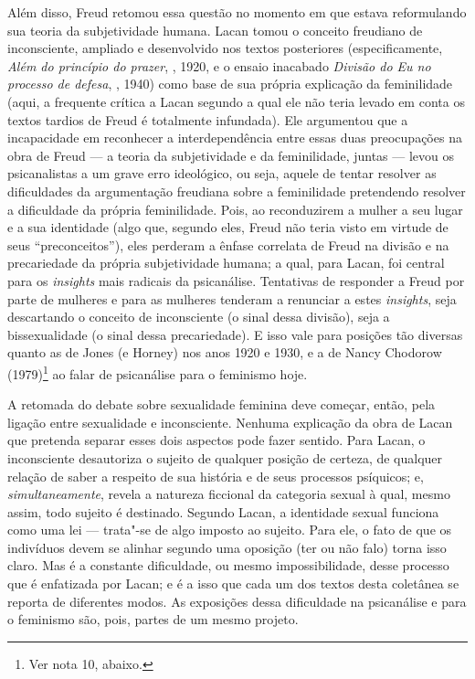 Além disso, Freud retomou essa questão no momento em que estava
reformulando sua teoria da subjetividade humana. Lacan tomou o conceito
freudiano de inconsciente, ampliado e desenvolvido nos textos
posteriores (especificamente, \emph{Além do princípio do prazer}, ,
1920, e o ensaio inacabado \emph{Divisão do Eu no processo de defesa},
, 1940) como base de sua própria explicação da feminilidade (aqui,
a frequente crítica a Lacan segundo a qual ele não teria levado em conta
os textos tardios de Freud é totalmente infundada). Ele argumentou que a
incapacidade em reconhecer a interdependência entre essas duas
preocupações na obra de Freud --- a teoria da subjetividade e da
feminilidade, juntas --- levou os psicanalistas a um grave erro
ideológico, ou seja, aquele de tentar resolver as dificuldades da
argumentação freudiana sobre a feminilidade pretendendo resolver a
dificuldade da própria feminilidade. Pois, ao reconduzirem a mulher a
seu lugar e a sua identidade (algo que, segundo eles, Freud não teria
visto em virtude de seus ``preconceitos''), eles perderam a ênfase
correlata de Freud na divisão e na precariedade da própria subjetividade
humana; a qual, para Lacan, foi central para os \emph{insights} mais
radicais da psicanálise. Tentativas de responder a Freud por parte de
mulheres e para as mulheres tenderam a renunciar a estes
\emph{insights}, seja descartando o conceito de inconsciente (o sinal
dessa divisão), seja a bissexualidade (o sinal dessa precariedade). E
isso vale para posições tão diversas quanto as de Jones (e Horney) nos
anos 1920 e 1930, e a de Nancy Chodorow (1979)\footnote{Ver nota 10,
  abaixo.} ao falar de psicanálise para o feminismo hoje.

A retomada do debate sobre sexualidade feminina deve começar, então,
pela ligação entre sexualidade e inconsciente. Nenhuma explicação da
obra de Lacan que pretenda separar esses dois aspectos pode fazer
sentido. Para Lacan, o inconsciente desautoriza o sujeito de qualquer
posição de certeza, de qualquer relação de saber a respeito de sua
história e de seus processos psíquicos; e, \emph{simultaneamente},
revela a natureza ficcional da categoria sexual à qual, mesmo assim,
todo sujeito é destinado. Segundo Lacan, a identidade sexual funciona
como uma lei --- trata"-se de algo imposto ao sujeito. Para ele, o fato de
que os indivíduos devem se alinhar segundo uma oposição (ter ou não
falo) torna isso claro. Mas é a constante dificuldade, ou mesmo
impossibilidade, desse processo que é enfatizada por Lacan; e é a isso
que cada um dos textos desta coletânea se reporta de diferentes modos.
As exposições dessa dificuldade na psicanálise e para o feminismo são,
pois, partes de um mesmo projeto.

